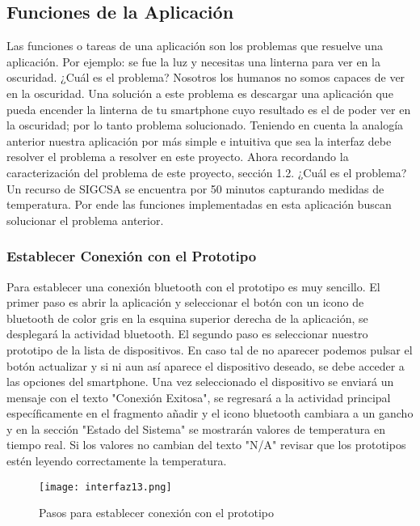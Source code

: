 \subsection{Funciones de la Aplicación}

\par 
Las funciones o tareas de una aplicación son los problemas que resuelve una aplicación. Por ejemplo: se fue la luz y necesitas una linterna para ver en la oscuridad. ¿Cuál es el problema? Nosotros los humanos no somos capaces de ver en la oscuridad. Una solución a este problema es descargar una aplicación que pueda encender la linterna de tu smartphone cuyo resultado es el de poder ver en la oscuridad; por lo tanto problema solucionado. Teniendo en cuenta la analogía anterior nuestra aplicación por más simple e intuitiva que sea la interfaz debe resolver el problema a resolver en este proyecto. Ahora recordando la caracterización del problema de este proyecto, sección 1.2. ¿Cuál es el problema? Un recurso de SIGCSA se encuentra por 50 minutos capturando medidas de temperatura. Por ende las funciones implementadas en esta aplicación buscan solucionar el problema anterior.

\subsubsection{Establecer Conexión con el Prototipo}

\par 
Para establecer una conexión bluetooth con el prototipo es muy sencillo. El primer paso es abrir la aplicación y seleccionar el botón con un icono de bluetooth de color gris en la esquina superior derecha de la aplicación, se desplegará la actividad bluetooth. El segundo paso es seleccionar nuestro prototipo de la lista de dispositivos. En caso tal de no aparecer podemos pulsar el botón actualizar y si ni aun así aparece el dispositivo deseado, se debe acceder a las opciones del smartphone. Una vez seleccionado el dispositivo se enviará un mensaje con el texto "Conexión Exitosa", se regresará a la actividad principal específicamente en el fragmento añadir y el icono bluetooth cambiara a un gancho y en la sección "Estado del Sistema" se mostrarán valores de temperatura en tiempo real. Si los valores no cambian del texto "N/A" revisar que los prototipos estén leyendo correctamente la temperatura.

\begin{figure}[H]
	\centering
	\texttt{[image: interfaz13.png]}
	\caption{Pasos para establecer conexión con el prototipo}
\end{figure}

